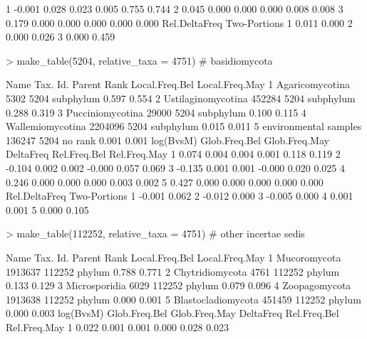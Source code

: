 \documentclass{article}
\begin{document}
\begin{Schunk}
\begin{Soutput}
1    -0.001         0.028         0.023     0.005        0.755        0.744
2     0.045         0.000         0.000     0.000        0.008        0.008
3     0.179         0.000         0.000     0.000        0.000        0.000
  Rel.DeltaFreq Two-Portions
1         0.011        0.000
2         0.000        0.026
3         0.000        0.459
\end{Soutput}
\begin{Sinput}
> make_table(5204, relative_taxa = 4751) # basidiomycota
\end{Sinput}
\begin{Soutput}
                   Name Tax. Id. Parent      Rank Local.Freq.Bel Local.Freq.May
1       Agaricomycotina     5302   5204 subphylum          0.597          0.554
2    Ustilaginomycotina   452284   5204 subphylum          0.288          0.319
3      Pucciniomycotina    29000   5204 subphylum          0.100          0.115
4      Wallemiomycotina  2204096   5204 subphylum          0.015          0.011
5 environmental samples   136247   5204   no rank          0.001          0.001
  log(BvsM) Glob.Freq.Bel Glob.Freq.May DeltaFreq Rel.Freq.Bel Rel.Freq.May
1     0.074         0.004         0.004     0.001        0.118        0.119
2    -0.104         0.002         0.002    -0.000        0.057        0.069
3    -0.135         0.001         0.001    -0.000        0.020        0.025
4     0.246         0.000         0.000     0.000        0.003        0.002
5     0.427         0.000         0.000     0.000        0.000        0.000
  Rel.DeltaFreq Two-Portions
1        -0.001        0.062
2        -0.012        0.000
3        -0.005        0.000
4         0.001        0.001
5         0.000        0.105
\end{Soutput}
\begin{Sinput}
> make_table(112252, relative_taxa = 4751)  # other incertae sedis
\end{Sinput}
\begin{Soutput}
                Name Tax. Id. Parent   Rank Local.Freq.Bel Local.Freq.May
1       Mucoromycota  1913637 112252 phylum          0.788          0.771
2    Chytridiomycota     4761 112252 phylum          0.133          0.129
3      Microsporidia     6029 112252 phylum          0.079          0.096
4      Zoopagomycota  1913638 112252 phylum          0.000          0.001
5 Blastocladiomycota   451459 112252 phylum          0.000          0.003
  log(BvsM) Glob.Freq.Bel Glob.Freq.May DeltaFreq Rel.Freq.Bel Rel.Freq.May
1     0.022         0.001         0.001     0.000        0.028        0.023

\end{Soutput}
\end{Schunk}
\end{document}
